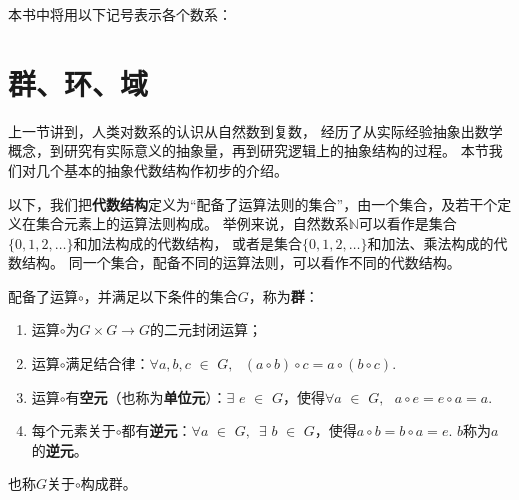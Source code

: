 \documentclass[12pt,UTF8,fontset=none]{ctexbook}
\begin{document}
\begin{appendix}
本书中将用以下记号表示各个数系：
\begin{center}
\end{center}

\section{群、环、域}

上一节讲到，人类对数系的认识从自然数到复数，
经历了从实际经验抽象出数学概念，到研究有实际意义的抽象量，再到研究逻辑上的抽象结构的过程。
本节我们对几个基本的抽象代数结构作初步的介绍。

以下，我们把\textbf{代数结构}定义为“配备了运算法则的集合”，由一个集合，及若干个定义在集合元素上的运算法则构成。
举例来说，自然数系$\mathbb{N}$可以看作是集合$\{0,1,2,\ldots\}$和加法构成的代数结构，
或者是集合$\{0,1,2,\ldots\}$和加法、乘法构成的代数结构。
同一个集合，配备不同的运算法则，可以看作不同的代数结构。

\begin{df}\label{df:0_1}
    配备了运算$\circ$，并满足以下条件的集合$G$，称为\textbf{群}：

    \begin{enumerate}
        \item 运算$\circ$为$G \times G \rightarrow G$的二元封闭运算；
        \item 运算$\circ$满足结合律：$\forall a, b, c\,\, \in\,\, G, \,\,\,\, (a\circ b) \circ c = a\circ (b \circ c).$
        \item 运算$\circ$有\textbf{空元}（也称为\textbf{单位元}）：$\exists \,\, e \,\, \in \,\, G$，使得$\forall a \,\, \in \,\, G, \,\,\,\, a \circ e = e \circ a = a. $
        \item 每个元素关于$\circ$都有\textbf{逆元}：$\forall a \,\, \in \,\, G, \,\,\, \exists \,\, b \,\, \in \,\, G$，使得$a \circ b = b \circ a = e.$ $b$称为$a$的\textbf{逆元}。
    \end{enumerate}
    也称$G$关于$\circ$构成群。
\end{df}


\end{appendix}
\end{document}
